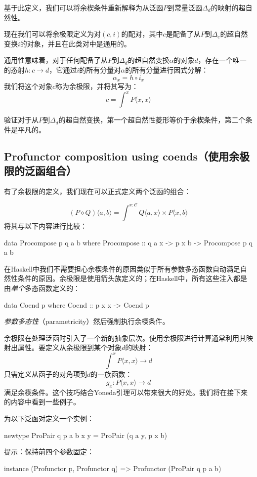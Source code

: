 \documentclass[DaoFP]{subfiles}
\begin{document}
 基于此定义，我们可以将余楔条件重新解释为从泛函$P$到常量泛函$\Delta_d$的映射的超自然性。

 现在我们可以将余极限定义为对$(c, i)$的配对，其中$c$是配备了从$P$到$\Delta_c$的超自然变换$i$的对象，并且在此类对中是通用的。

 通用性意味着，对于任何配备了从$P$到$\Delta_d$的超自然变换$\alpha$的对象$d$，存在一个唯一的态射$h \colon c \to d$，它通过$i$的所有分量对$\alpha$的所有分量进行因式分解：
 \[ \alpha_x = h \circ i_x \]
 我们将这个对象$c$称为余极限，并将其写为：
 \[ c = \int^x P\langle x, x \rangle \]

 \begin{exercise}
  验证对于从$P$到$\Delta_d$的超自然变换，第一个超自然性菱形等价于余楔条件，第二个条件是平凡的。
 \end{exercise}

 \subsection{Profunctor composition using coends（使用余极限的泛函组合）}

 有了余极限的定义，我们现在可以正式定义两个泛函的组合：

 \[ (P \diamond Q)\langle a, b \rangle = \int^{x\colon \mathcal{C}} Q \langle a, x \rangle \times P \langle x, b \rangle\]
 将其与以下内容进行比较：
 \begin{haskell}
  data Procompose p q a b where
  Procompose ::  q a x -> p x b -> Procompose p q a b
 \end{haskell}

 在Haskell中我们不需要担心余楔条件的原因类似于所有参数多态函数自动满足自然性条件的原因。余极限是使用箭头族定义的；在Haskell中，所有这些注入都是由\emph{单个}多态函数定义的：
 \begin{haskell}
  data Coend p where
  Coend ::  p x x -> Coend p
 \end{haskell}
 \emph{参数多态性}（parametricity）然后强制执行余楔条件。

 余极限在处理泛函时引入了一个新的抽象层次。使用余极限进行计算通常利用其映射出属性。要定义从余极限到某个对象$d$的映射：
 \[ \int^x P \langle x, x \rangle \to d \]
 只需定义从函子的对角项到$d$的一族函数：
 \[ g_x \colon P \langle x, x \rangle \to d \]
 满足余楔条件。这个技巧结合Yoneda引理可以带来很大的好处。我们将在接下来的内容中看到一些例子。

 \begin{exercise}
  为以下泛函对定义一个实例：
  \begin{haskell}
   newtype ProPair q p a b x y = ProPair (q a y, p x b)
  \end{haskell}
  提示：保持前四个参数固定：
  \begin{haskell}
   instance (Profunctor p, Profunctor q) => Profunctor (ProPair q p a b)
  \end{haskell}
 \end{exercise}
\end{document}
